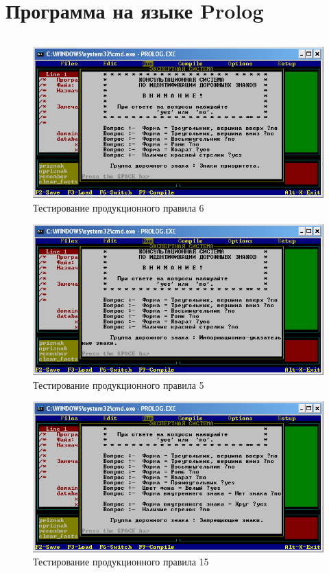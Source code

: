 \section{Программа на языке Prolog}

\inputminted[encoding=cp866]{prolog}{src/Prog.pro}

\begin{figure}[H]
	\centering
	\includegraphics{fig/screen1}
	\caption{Тестирование продукционного правила 6}
	\label{fig:screen1}
\end{figure}

\begin{figure}[H]
	\centering
	\includegraphics{fig/screen2}
	\caption{Тестирование продукционного правила 5}
	\label{fig:screen2}
\end{figure}

\begin{figure}[H]
	\centering
	\includegraphics{fig/screen3}
	\caption{Тестирование продукционного правила 15}
	\label{fig:screen3}
\end{figure}

